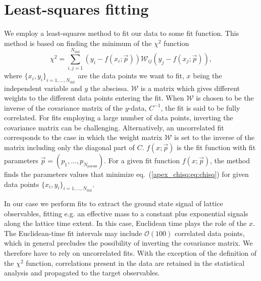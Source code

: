 
\chapter{Least-squares fitting}
\label{apex_chisq}

We employ a least-squares method to fit our data to some fit function. This method is based on finding the  minimum of the $\chi^2$ function
\begin{equation}
\label{apex_chisq:eq:chisq}
\chi^2=\sum_{i,j=1}^{N_{\textrm{dat}}}\left(y_i-f(x_i;\vec{p})\right)\mathcal{W}_{ij}\left(y_j-f(x_j;\vec{p})\right),
\end{equation}
where $\{x_i,y_i\}_{i=1,...,N_{\textrm{dat}}}$ are the data points we want to fit, $x$ being the independent variable and $y$ the abscissa. $\mathcal{W}$ is a matrix which gives different weights to the different data points entering the fit. When $\mathcal{W}$ is chosen to be the inverse of the covariance matrix of the $y$-data, $C^{-1}$, the fit is said to be fully correlated. For fits employing a large number of data points, inverting the covariance matrix can be challenging. Alternatively, an uncorrelated fit corresponds to the case in which the weight matrix $\mathcal{W}$ is set to the  inverse of the matrix including only the diagonal part of $C$. $f(x;\vec{p})$ is the fit function with fit parameters $\vec{p}=(p_1,...,p_{N_{\textrm{param}}})$. For a given fit function $f(x;\vec{p})$, the method finds the parameters values that minimize eq.~(\ref{apex_chisq:eq:chisq}) for given data points $\{x_i,y_i\}_{i=1,...,N_{\textrm{dat}}}$.

In our case we perform fits to extract the ground state signal of lattice observables, fitting e.g. an effective mass to a constant plus exponential signals along the lattice time extent. In this case, Euclidean time plays the role of the $x$. The Euclidean-time fit intervals may include $\mathcal{O}(100)$ correlated data points, which in general precludes the possibility of inverting the covariance matrix. We therefore have to rely on uncorrelated fits. With the exception of the definition of the $\chi^2$ function, correlations present in the data are retained in the statistical analysis and propagated to the target observables.

